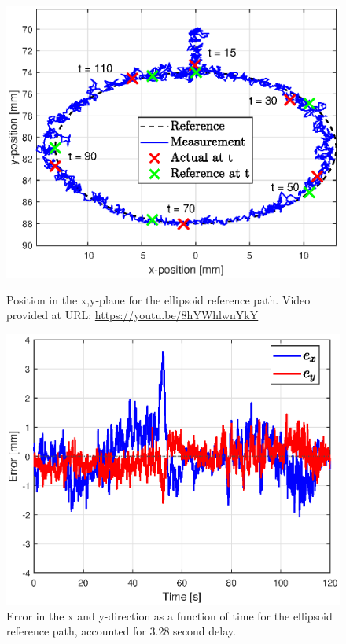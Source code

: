 \begin{figure}[H] 
    \begin{minipage}[b]{0.49\linewidth}
    \centering
    \includegraphics[width = \textwidth]{Figures/Chapter5/posellips.eps}
    \caption{Position in the x,y-plane for the ellipsoid reference path. Video provided at URL: \url{https://youtu.be/8hYWhlwnYkY}}
    \label{fig5:xyelips}
       \end{minipage} 
    \begin{minipage}[b]{0.49\linewidth}
    \centering
    \includegraphics[width = \textwidth]{Figures/Chapter5/errorellips.eps}
    \caption{Error in the x and y-direction as a function of time for the ellipsoid reference path, accounted for 3.28 second delay.}
    \label{fig5:errorelips}
    \end{minipage} 
\end{figure}

